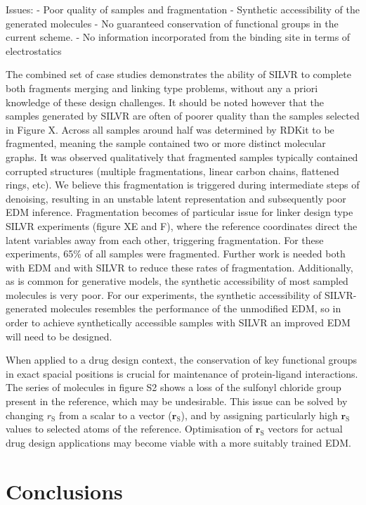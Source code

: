 \documentclass[journal=jacsat,manuscript=article]{achemso}
\begin{document}
Issues:
- Poor quality of samples and fragmentation
- Synthetic accessibility of the generated molecules
- No guaranteed conservation of functional groups in the current scheme. 
- No information incorporated from the binding site in terms of electrostatics

The combined set of case studies demonstrates the ability of SILVR to complete both fragments merging and linking type problems, without any a priori knowledge of these design challenges. It should be noted however that the samples generated by SILVR are often of poorer quality than the samples selected in Figure X. Across all samples around half was determined by RDKit to be fragmented, meaning the sample contained two or more distinct molecular graphs. It was observed qualitatively that fragmented samples typically contained corrupted structures (multiple fragmentations, linear carbon chains, flattened rings, etc). We believe this fragmentation is triggered during intermediate steps of denoising, resulting in an unstable latent representation and subsequently poor EDM inference. Fragmentation becomes of particular issue for linker design type SILVR experiments (figure XE and F), where the reference coordinates direct the latent variables away from each other, triggering fragmentation. For these experiments, 65\% of all samples were fragmented. Further work is needed both with EDM and with SILVR to reduce these rates of fragmentation. Additionally, as is common for generative models, the synthetic accessibility of most sampled molecules is very poor. For our experiments, the synthetic accessibility of SILVR-generated molecules resembles the performance of the unmodified EDM, so in order to achieve synthetically accessible samples with SILVR an improved EDM will need to be designed. 


When applied to a drug design context, the conservation of key functional groups in exact spacial positions is crucial for maintenance of protein-ligand interactions. The series of molecules in figure S2 shows a loss of the sulfonyl chloride group present in the reference, which may be undesirable. This issue can be solved by changing $r_{\mathrm{S}}$ from a scalar to a vector ($\mathbf{r}_{\mathrm{S}}$), and by assigning particularly high $\mathbf{r}_{\mathrm{S}}$ values to selected atoms of the reference. Optimisation of $\mathbf{r}_{\mathrm{S}}$ vectors for actual drug design applications may become viable with a more suitably trained EDM.

\section{Conclusions}
\end{document}
